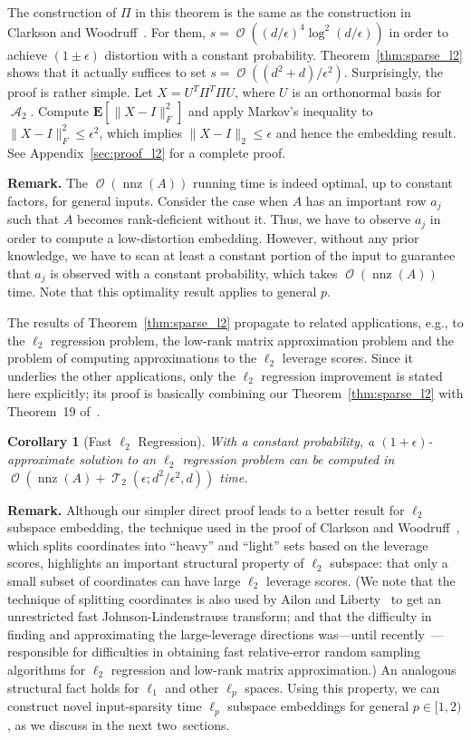 \documentclass[11pt]{article}
\newtheorem{corollary}{Corollary}
\DeclareMathOperator{\bigO}{\mathcal{O}}
\DeclareMathOperator{\nnz}{nnz}
\DeclareMathOperator{\A}{\mathcal{A}}
\DeclareMathOperator{\T}{\mathcal{T}}
\begin{document}
\noindent
The construction of $\Pi$ in this theorem is the same as the construction in
Clarkson and Woodruff~\cite{CW12sparse_TR}.
For them, $s = \bigO((d/\epsilon)^4 \log^2(d/\epsilon))$ in order to achieve $(1
\pm \epsilon)$ distortion with a constant probability. 
Theorem~\ref{thm:sparse_l2} shows that it actually suffices to set $s =
\bigO((d^2 + d)/\epsilon^2)$.
Surprisingly, the proof is rather simple.
Let $X = U^T \Pi^T \Pi U$, where $U$ is an orthonormal basis for $\A_2$.
Compute $\mathbf{E}[\|X-I\|_F^2]$ and apply Markov's inequality to $\|X -
I\|_F^2 \leq \epsilon^2$, which implies $\|X - I\|_2 \leq \epsilon$ and hence
the embedding result.
See Appendix~\ref{sec:proof_l2} for a complete proof. 

\noindent
\textbf{Remark.} 
The $\bigO(\nnz(A))$ running time is indeed optimal, up to constant factors, 
for general inputs.
Consider the case when $A$ has an important row $a_j$ such that $A$ becomes
rank-deficient without it.
Thus, we have to observe $a_j$ in order to compute a low-distortion embedding.
However, without any prior knowledge, we have to scan at least a constant
portion of the input to guarantee that $a_j$ is observed with a constant
probability, which takes $\bigO(\nnz(A))$ time.
Note that this optimality result applies to general $p$.

The results of Theorem~\ref{thm:sparse_l2} propagate to related applications,
e.g., to the $\ell_2$ regression problem, the low-rank matrix approximation
problem and the problem of computing approximations to the $\ell_2$ leverage
scores.
Since it underlies the other applications, only the $\ell_2$ regression
improvement is stated here explicitly; its proof is basically combining our
Theorem~\ref{thm:sparse_l2} with Theorem~19 of~\cite{CW12sparse_TR}.

\begin{corollary}[Fast $\ell_2$ Regression]
  With a constant probability, a $(1+\epsilon)$-approximate solution to an
  $\ell_2$ regression problem can be computed in $\bigO(\nnz(A) + \T_2(\epsilon;
  d^2 / \epsilon^2, d))$ time.
\end{corollary}


\noindent
\textbf{Remark.}  
Although our simpler direct proof leads to a better result for $\ell_2$ subspace
embedding, the technique used in the proof of Clarkson and
Woodruff~\cite{CW12sparse_TR}, which splits coordinates into ``heavy'' and
``light'' sets based on the leverage scores, highlights an important structural
property of $\ell_2$ subspace: that only a small subset of coordinates can have
large $\ell_2$ leverage scores.  
(We note that the technique of splitting coordinates is also used by Ailon and
Liberty~\cite{AL11} to get an unrestricted fast Johnson-Lindenstrauss transform;
and that the difficulty in finding and approximating the large-leverage
directions was---until
recently~\cite{Mah-mat-rev_BOOK,DMMW12_ICML}---responsible for difficulties in
obtaining fast relative-error random sampling algorithms for $\ell_2$ regression
and low-rank matrix approximation.)  
An analogous structural fact holds for $\ell_1$ and other $\ell_p$ spaces.  
Using this property, we can construct novel input-sparsity time $\ell_p$ 
subspace embeddings for general $p \in [1, 2)$, as we discuss in the next 
two~sections.
\end{document}
